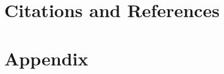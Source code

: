% 

% 

\clearpage
\section{Citations and References}
\printbibliography

\clearpage
\section{Appendix}


